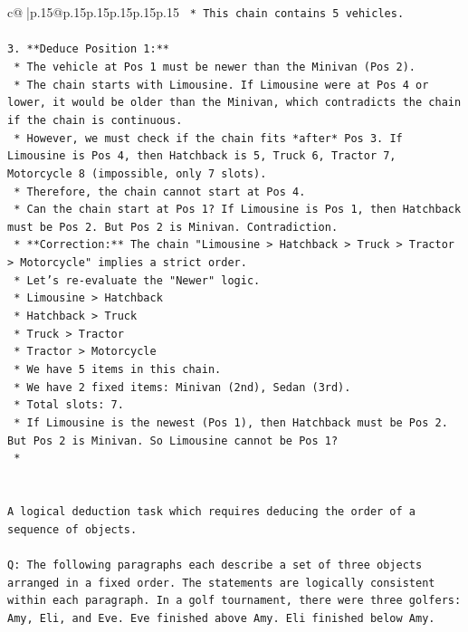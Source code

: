 \documentclass{article}
\begin{document}
{\begin{supertabular}{c@{$\;$}|p{.15\linewidth}@{}p{.15\linewidth}p{.15\linewidth}p{.15\linewidth}p{.15\linewidth}p{.15\linewidth}}
{{{\texttt{    *   This chain contains 5 vehicles.} \\
\\ 
\texttt{3.  **Deduce Position 1:**} \\
\texttt{    *   The vehicle at Pos 1 must be newer than the Minivan (Pos 2).} \\
\texttt{    *   The chain starts with Limousine. If Limousine were at Pos 4 or lower, it would be older than the Minivan, which contradicts the chain if the chain is continuous.} \\
\texttt{    *   However, we must check if the chain fits *after* Pos 3. If Limousine is Pos 4, then Hatchback is 5, Truck 6, Tractor 7, Motorcycle 8 (impossible, only 7 slots).} \\
\texttt{    *   Therefore, the chain cannot start at Pos 4.} \\
\texttt{    *   Can the chain start at Pos 1? If Limousine is Pos 1, then Hatchback must be Pos 2. But Pos 2 is Minivan. Contradiction.} \\
\texttt{    *   **Correction:** The chain "Limousine > Hatchback > Truck > Tractor > Motorcycle" implies a strict order.} \\
\texttt{    *   Let's re{-}evaluate the "Newer" logic.} \\
\texttt{        *   Limousine > Hatchback} \\
\texttt{        *   Hatchback > Truck} \\
\texttt{        *   Truck > Tractor} \\
\texttt{        *   Tractor > Motorcycle} \\
\texttt{    *   We have 5 items in this chain.} \\
\texttt{    *   We have 2 fixed items: Minivan (2nd), Sedan (3rd).} \\
\texttt{    *   Total slots: 7.} \\
\texttt{    *   If Limousine is the newest (Pos 1), then Hatchback must be Pos 2. But Pos 2 is Minivan. So Limousine cannot be Pos 1?} \\
\texttt{    *} \\
\\ 
\\ 
\texttt{A logical deduction task which requires deducing the order of a sequence of objects.} \\
\\ 
\texttt{Q: The following paragraphs each describe a set of three objects arranged in a fixed order. The statements are logically consistent within each paragraph. In a golf tournament, there were three golfers: Amy, Eli, and Eve. Eve finished above Amy. Eli finished below Amy.} \\
}}}
\end{supertabular}}
\end{document}
